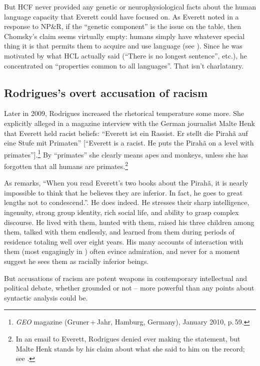\documentclass[output=paper,colorlinks,citecolor=brown
]{langscibook}
\begin{document}
But HCF never provided any genetic or neurophysiological facts about the
human language capacity that Everett could have focused on. As Everett
noted in a response to NP\&R, if the ``genetic component'' is the issue
on the table, then Chomsky's claim seems virtually empty: humans simply
have whatever special thing it is that permits them to acquire and use
language (see \citealt[439]{Everett09}). Since he was motivated by what
HCL actually said (``There is no longest sentence'', etc.), he concentrated
on ``properties common to all languages''. That isn't charlatanry.

\subsection{Rodrigues's overt accusation of racism}

Later in 2009, Rodrigues increased the rhetorical temperature some
more. She explicitly alleged in a magazine interview with the German
journalist Malte Henk that Everett held racist beliefs: ``Everett ist
ein Rassist.  Er stellt die Pirah{\~a} auf eine Stufe mit Primaten''
[``Everett is a racist.  He puts the Pirah{\~a} on a level with
primates''].\footnote{
   \textit{GEO} magazine (Gruner\,+\,Jahr, Hamburg, Germany),
   January 2010, p.\,59.}
By ``primates'' she clearly means apes and monkeys, unless she has
forgotten that all humans are primates.\footnote{\label{denial}%
   In an email to Everett, Rodrigues denied ever making the statement,
   but Malte Henk stands by his claim about what she said to him on the
   record; see \citet[13]{Everett13}.}

As \citet{Bartlett12} remarks, ``When you read Everett’s two books about
the Pirah{\~a}, it is nearly impossible to think that he believes they
are inferior. In fact, he goes to great lengths not to condescend.''.
He does indeed.  He stresses their sharp intelligence, ingenuity, strong
group identity, rich social life, and ability to grasp complex discourse.
He lived with them, hunted with them, raised his three children among
them, talked with them endlessly, and learned from them during periods
of residence totaling well over eight years. His many accounts of
interaction with them (most engagingly in \citealt{Everett08}) often
evince admiration, and never for a moment suggest he sees them as
racially inferior beings.

But accusations of racism are potent weapons in contemporary
intellectual and political debate, whether grounded or not --
more powerful than any points about syntactic analysis could be.
\end{document}
